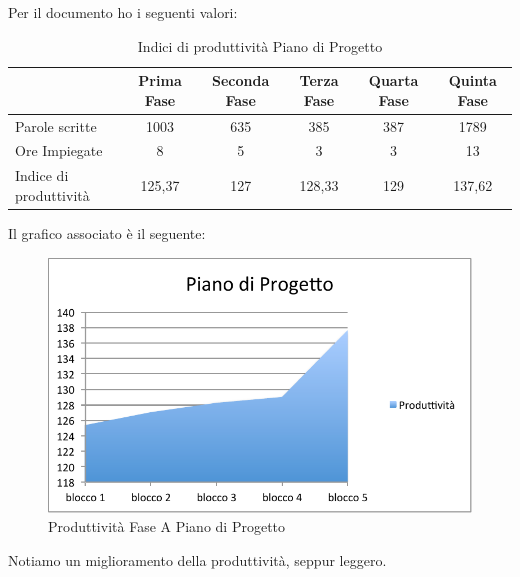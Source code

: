 						Per il documento  ho i seguenti valori:
						\begin{table}[H]\centering
							\begin{tabu}{| l | c | c | c | c | c |}
								\hline
													&Prima Fase 	& Seconda Fase	& Terza Fase	& Quarta Fase 	& Quinta Fase  \\ \hline
												
								Parole scritte				& 1003		& 635 		& 385			& 387 		& 1789 	 \\ \hline
								Ore Impiegate				& 8			& 5 			& 3				& 3	 		& 13	 	  \\ \hline\hline
							
								Indice di produttività 			 & 125,37		& 127 		& 128,33			& 129 		& 137,62 	  \\ \hline
							\end{tabu}
							\caption{Indici di produttività Piano di Progetto}
						\end{table}
						Il grafico associato è il seguente:
						\begin{figure}[H]\centering
							\includegraphics[width=12cm]{PianoDiQualifica/Pics/ProduttivitaPdPFaseA.pdf}
							\caption{Produttività Fase A Piano di Progetto}
						\end{figure}
						Notiamo un miglioramento della produttività, seppur leggero.\\
					
